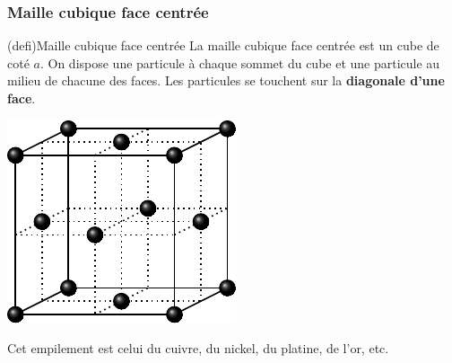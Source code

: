 \documentclass[../../main/main.tex]{subfiles}
\begin{document}
\subsubsection{Maille cubique face centrée}
\begin{tcb*}[sidebyside, righthand ratio=.25](defi){Maille cubique face centrée}
	La maille cubique face centrée est un cube de coté $a$. On dispose une
	particule à chaque sommet du cube et une particule au milieu de chacune des
	faces. Les particules se touchent sur la \textbf{diagonale d'une face}.
	\tcblower
	\begin{center}
		\includegraphics[width=\linewidth]{maille_CFC}
	\end{center}
\end{tcb*}
Cet empilement est celui du cuivre, du nickel, du platine, de l'or, etc.
\end{document}
